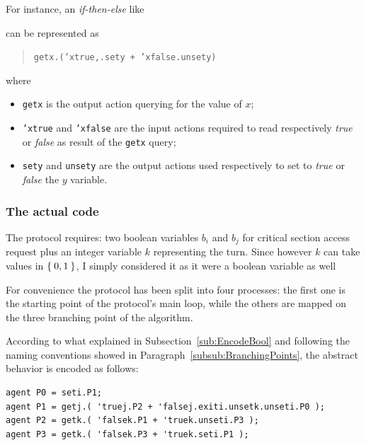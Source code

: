 \documentclass[10pt,a4paper]{article}
\newcommand{\CCSCode}[1]{{\tt #1}}
\begin{document}
            \noindent For instance, an \emph{if-then-else} like
            \begin{quote}
                \begin{algorithm}[H]
                \end{algorithm}
            \end{quote}
            can be represented as
            \begin{quote}
            \CCSCode{getx.('xtrue,.sety + 'xfalse.unsety)}
            \end{quote}
            where
            \begin{itemize}

            \item   \CCSCode{getx} is the output action querying for the
                    value of $x$;

            \item   \CCSCode{'xtrue} and \CCSCode{'xfalse} are the input
                    actions required to read respectively \emph{true} or
                    \emph{false} as result of the \CCSCode{getx} query;

            \item   \CCSCode{sety} and \CCSCode{unsety} are the output
                    actions used respectively to set to \emph{true} or
                    \emph{false} the $y$ variable.

            \end{itemize}

        \subsubsection{The actual code}

            The protocol requires: two boolean variables $b_i$ and $b_j$
            for critical section access request plus an integer variable
            $k$ representing the turn. Since however $k$ can take values in
            $\Set{0, 1}$, I simply considered it as it were a boolean
            variable as well

            For convenience the protocol has been split into four
            processes: the first one is the starting point of the
            protocol's main loop, while the others are mapped on the three
            branching point of the algorithm.

            According to what explained in Subsection~\ref{sub:EncodeBool}
            and following the naming conventions showed in
            Paragraph~\ref{subsub:BranchingPoints}, the abstract behavior
            is encoded as follows:
\begin{verbatim}
agent P0 = seti.P1;
agent P1 = getj.( 'truej.P2 + 'falsej.exiti.unsetk.unseti.P0 );
agent P2 = getk.( 'falsek.P1 + 'truek.unseti.P3 );
agent P3 = getk.( 'falsek.P3 + 'truek.seti.P1 );
\end{verbatim}
\end{document}
